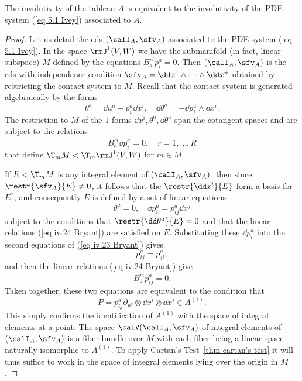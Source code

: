 \begin{prop}\label{prop iv.3.8 Bryant}
    The involutivity of the tableau $A$ is equivalent to the involutivity of the PDE system (\ref{eq 5.1 Ivey}) associated to $A$.
\end{prop}
\begin{proof}
    Let us detail the \gls{eds} $(\calI_A,\sfv_A)$ associated to the PDE system (\ref{eq 5.1 Ivey}). In the space $\rmJ^1(V,W)$ we have the submanifold (in fact, linear subspace) $M$ defined by the equations $B^{r i}_ap^a_i=0$. Then $(\calI_A,\sfv_A)$ is the \gls{eds} with independence condition $\sfv_A=\dd x^1\wedge\cdots\wedge\dd x^n$ obtained by restricting the contact system to $M$. Recall that the contact system is generated algebraically by the forms 
    \[\theta^a=\dd u^a-p^a_i\dd x^i,\quad \dd \theta^a=-\dd p^a_i\wedge\dd x^i.\label{eq iv.23 Bryant}\]
    The restriction to $M$ of the $1$-forms $\dd x^i,\theta^a,\dd\theta^a$ span the cotangent spaces and are subject to the relations 
    \[B^{r i}_a \dd p^a_i=0,\quad r=1,\ldots,R\label{eq iv.24 Bryant}\]
    that define $\T_m M <\T_m \rmJ^1(V,W)$ for $m\in M$.

    If $E<\T_m M$ is any integral element of $(\calI_A,\sfv_A)$, then since $\restr{\sfv_A}{E}\neq 0$, it follows that the $\restr{\dd x^i}{E}$ form a basis for $E^\ast$, and consequently $E$ is defined by a set of linear equations 
    \[\theta^a=0,\quad \dd p^a_i=p^a_{ij}\dd x^j\label{eq iv.25 Bryant}\]
    subject to the conditions that $\restr{\dd \theta^a}{E}=0$ and that the linear relations (\ref{eq iv.24 Bryant}) are satisfied on $E$. Substituting these $\dd p^a_i$ into the second equations of (\ref{eq iv.23 Bryant}) gives 
    \[p^a_{ij}=p^a_{ji},\]
    and then the linear relations (\ref{eq iv.24 Bryant}) give 
    \[B^{ri}_a p^a_{ij}=0.\]
    Taken together, these two equations are equivalent to the condition that 
    \[P=p^a_{ij}\partial_{u^a}\otimes \dd x^i\otimes\dd x^j\in A^{(1)}.\]
    This simply confirms the identification of $A^{(1)}$ with the space of integral elements at a point. The space $\calV(\calI_A,\sfv_A)$ of integral elements of $(\calI_A,\sfv_A)$ is a fiber bundle over $M$ with each fiber being a linear space naturally isomorphic to $A^{(1)}$. To apply Cartan's Test~\ref{thm cartan's test} it will thus suffice to work in the space of integral elements lying over the origin in $M$.


\end{proof}
